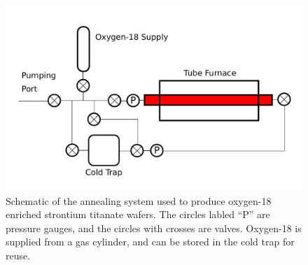 \documentclass{thesis-umich}
\begin{document}
\begin{figure} \caption[Strontium Titanate Annealing System]{Schematic of the annealing system used to produce oxygen-18 enriched strontium titanate wafers. The circles labled ``P'' are pressure gauges, and the circles with crosses are valves. Oxygen-18 is supplied from a gas cylinder, and can be stored in the cold trap for reuse.}
\includegraphics[width=\columnwidth]{figures/annealing_system.pdf}
\end{figure}
\end{document}
